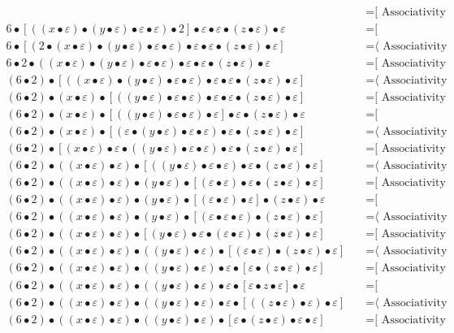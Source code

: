 \documentclass{article}
\begin{document}
\begin{align*}
  & \quad \text{=[ Associativity ⟩}\\
6 • [((x • ε) • (y • ε) • ε • ε) • 2] • ε • ε • (z • ε) • ε
  & \quad \text{=[ Commutativity ⟩}\\
6 • [(2 • (x • ε) • (y • ε) • ε • ε) • ε • ε • (z • ε) • ε]
  & \quad \text{=⟨ Associativity ]}\\
6 • 2 • ((x • ε) • (y • ε) • ε • ε) • ε • ε • (z • ε) • ε
  & \quad \text{=[ Associativity ⟩}\\
(6 • 2) • [((x • ε) • (y • ε) • ε • ε) • ε • ε • (z • ε) • ε]
  & \quad \text{=⟨ Associativity ]}\\
(6 • 2) • (x • ε) • [((y • ε) • ε • ε) • ε • ε • (z • ε) • ε]
  & \quad \text{=[ Associativity ⟩}\\
(6 • 2) • (x • ε) • [((y • ε) • ε • ε) • ε] • ε • (z • ε) • ε
  & \quad \text{=[ Commutativity ⟩}\\
(6 • 2) • (x • ε) • [(ε • (y • ε) • ε • ε) • ε • (z • ε) • ε]
  & \quad \text{=⟨ Associativity ]}\\
(6 • 2) • [(x • ε) • ε • ((y • ε) • ε • ε) • ε • (z • ε) • ε]
  & \quad \text{=[ Associativity ⟩}\\
(6 • 2) • ((x • ε) • ε) • [((y • ε) • ε • ε) • ε • (z • ε) • ε]
  & \quad \text{=⟨ Associativity ]}\\
(6 • 2) • ((x • ε) • ε) • (y • ε) • [(ε • ε) • ε • (z • ε) • ε]
  & \quad \text{=[ Associativity ⟩}\\
(6 • 2) • ((x • ε) • ε) • (y • ε) • [(ε • ε) • ε] • (z • ε) • ε
  & \quad \text{=[ Commutativity ⟩}\\
(6 • 2) • ((x • ε) • ε) • (y • ε) • [(ε • ε • ε) • (z • ε) • ε]
  & \quad \text{=⟨ Associativity ]}\\
(6 • 2) • ((x • ε) • ε) • [(y • ε) • ε • (ε • ε) • (z • ε) • ε]
  & \quad \text{=[ Associativity ⟩}\\
(6 • 2) • ((x • ε) • ε) • ((y • ε) • ε) • [(ε • ε) • (z • ε) • ε]
  & \quad \text{=⟨ Associativity ]}\\
(6 • 2) • ((x • ε) • ε) • ((y • ε) • ε) • ε • [ε • (z • ε) • ε]
  & \quad \text{=[ Associativity ⟩}\\
(6 • 2) • ((x • ε) • ε) • ((y • ε) • ε) • ε • [ε • z • ε] • ε
  & \quad \text{=[ Commutativity ⟩}\\
(6 • 2) • ((x • ε) • ε) • ((y • ε) • ε) • ε • [((z • ε) • ε) • ε]
  & \quad \text{=⟨ Associativity ]}\\
(6 • 2) • ((x • ε) • ε) • ((y • ε) • ε) • [ε • (z • ε) • ε • ε]
  & \quad \text{=[ Associativity ⟩}\\

\end{align*}
\end{document}
